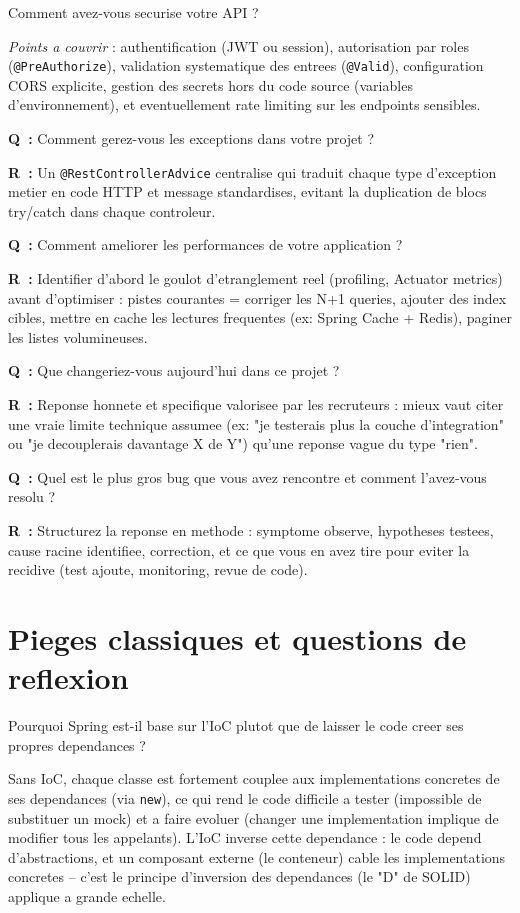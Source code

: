 \documentclass[11pt,a4paper]{article}
\newcommand{\qr}[2]{%
  \par\noindent\textbf{Q~:} #1\par
  \noindent\textbf{R~:} #2\par\smallskip
}
\begin{document}
\begin{question} Comment avez-vous securise votre API ?
\end{question}
\begin{reponse}
\emph{Points a couvrir} : authentification (JWT ou session), autorisation par roles (\texttt{@PreAuthorize}), validation systematique des entrees (\texttt{@Valid}), configuration CORS explicite, gestion des secrets hors du code source (variables d'environnement), et eventuellement rate limiting sur les endpoints sensibles.
\end{reponse}

\qr{Comment gerez-vous les exceptions dans votre projet ?}{Un \texttt{@RestControllerAdvice} centralise qui traduit chaque type d'exception metier en code HTTP et message standardises, evitant la duplication de blocs try/catch dans chaque controleur.}

\qr{Comment ameliorer les performances de votre application ?}{Identifier d'abord le goulot d'etranglement reel (profiling, Actuator metrics) avant d'optimiser : pistes courantes = corriger les N+1 queries, ajouter des index cibles, mettre en cache les lectures frequentes (ex: Spring Cache + Redis), paginer les listes volumineuses.}

\qr{Que changeriez-vous aujourd'hui dans ce projet ?}{Reponse honnete et specifique valorisee par les recruteurs : mieux vaut citer une vraie limite technique assumee (ex: "je testerais plus la couche d'integration" ou "je decouplerais davantage X de Y") qu'une reponse vague du type "rien".}

\qr{Quel est le plus gros bug que vous avez rencontre et comment l'avez-vous resolu ?}{Structurez la reponse en methode : symptome observe, hypotheses testees, cause racine identifiee, correction, et ce que vous en avez tire pour eviter la recidive (test ajoute, monitoring, revue de code).}

\newpage
\section{Pieges classiques et questions de reflexion}

\begin{question} Pourquoi Spring est-il base sur l'IoC plutot que de laisser le code creer ses propres dependances ?
\end{question}
\begin{reponse}
Sans IoC, chaque classe est fortement couplee aux implementations concretes de ses dependances (via \texttt{new}), ce qui rend le code difficile a tester (impossible de substituer un mock) et a faire evoluer (changer une implementation implique de modifier tous les appelants). L'IoC inverse cette dependance : le code depend d'abstractions, et un composant externe (le conteneur) cable les implementations concretes -- c'est le principe d'inversion des dependances (le "D" de SOLID) applique a grande echelle.
\end{reponse}
\end{document}
